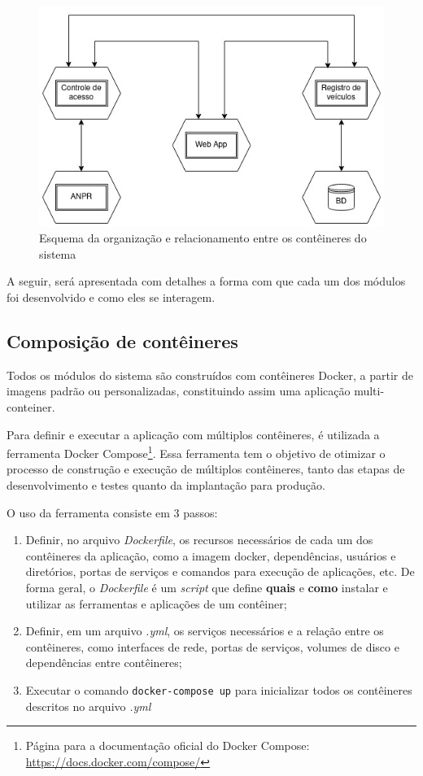 \documentclass[12pt]{article}
\begin{document}
\begin{figure}[ht]
	\centering
	\includegraphics[width=1\textwidth]{anpr-auth.jpg}
	\caption{Esquema da organização e relacionamento entre os contêineres do sistema}
	\label{fig:anpr-auth}
\end{figure}

A seguir, será apresentada com detalhes a forma com que cada um dos módulos foi desenvolvido e como eles se interagem.

\subsection{Composição de contêineres}

Todos os módulos do sistema são construídos com contêineres Docker, a partir de imagens padrão ou personalizadas, constituindo assim uma aplicação multi-conteiner.

Para definir e executar a aplicação com múltiplos contêineres, é utilizada a ferramenta Docker Compose\footnote{Página para a documentação oficial do Docker Compose: \url{https://docs.docker.com/compose/}}. Essa ferramenta tem o objetivo de otimizar o processo de construção e execução de múltiplos contêineres, tanto das etapas de desenvolvimento e testes quanto da implantação para produção.

O uso da ferramenta consiste em 3 passos:

\begin{enumerate}
	\item Definir, no arquivo \textit{Dockerfile}, os recursos necessários de cada um dos contêineres da aplicação, como a imagem docker, dependências, usuários e diretórios, portas de serviços e comandos para execução de aplicações, etc. De forma geral, o \textit{Dockerfile} é um \textit{script} que define \textbf{quais} e \textbf{como} instalar e utilizar as ferramentas e aplicações de um contêiner;
	\item Definir, em um arquivo \textit{.yml}, os serviços necessários e a relação entre os contêineres, como interfaces de rede, portas de serviços, volumes de disco e dependências entre contêineres;
	\item Executar o comando \texttt{docker-compose up} para inicializar todos os contêineres descritos no arquivo \textit{.yml}
\end{enumerate}
\end{document}
